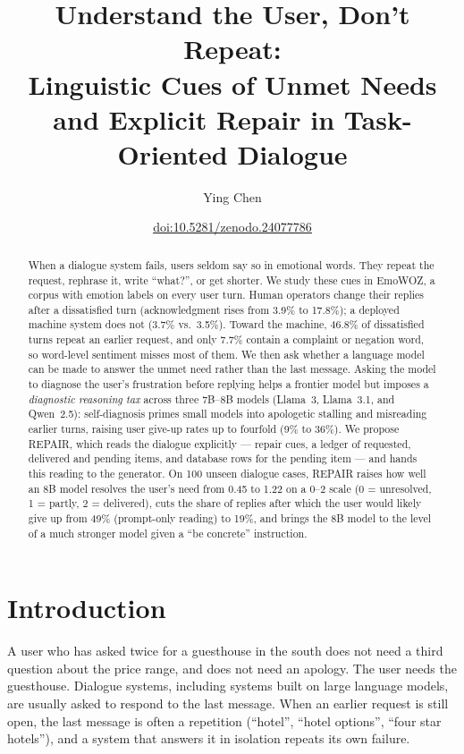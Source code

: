 \documentclass[11pt]{article}
\title{Understand the User, Don't Repeat:\\
Linguistic Cues of Unmet Needs and Explicit Repair in Task-Oriented Dialogue}
\author{Ying Chen}
\date{\href{https://doi.org/10.5281/zenodo.24077786}{doi:10.5281/zenodo.24077786}}
\begin{document}
\maketitle

\begin{abstract}
When a dialogue system fails, users seldom say so in emotional words. They repeat the request, rephrase it,
write ``what?'', or get shorter. We study these cues in EmoWOZ, a corpus with emotion labels on every user turn.
Human operators change their replies after a dissatisfied turn (acknowledgment rises from 3.9\% to 17.8\%);
a deployed machine system does not (3.7\% vs.\ 3.5\%). Toward the machine, 46.8\% of dissatisfied turns repeat
an earlier request, and only 7.7\% contain a complaint or negation word, so word-level sentiment misses most
of them. We then ask whether a language model can be made to answer the unmet need rather than the last
message. Asking the model to diagnose the user's frustration before replying helps a frontier model but
imposes a \emph{diagnostic reasoning tax} across three 7B--8B models (Llama~3, Llama~3.1, and Qwen~2.5):
self-diagnosis primes small models into apologetic stalling and misreading earlier turns, raising user give-up
rates up to fourfold (9\% to 36\%). We propose REPAIR, which reads the dialogue
explicitly --- repair cues, a ledger of requested, delivered and pending items, and database rows for the
pending item --- and hands this reading to the generator. On 100 unseen dialogue cases, REPAIR raises how
well an 8B model resolves the user's need from 0.45 to 1.22 on a 0--2 scale (0 = unresolved, 1 = partly,
2 = delivered), cuts the share of replies after which the user would likely give up from 49\% (prompt-only
reading) to 19\%, and brings the 8B model to the level of a much stronger model given a ``be concrete''
instruction.
\end{abstract}

\section{Introduction}
A user who has asked twice for a guesthouse in the south does not need a third question about the price
range, and does not need an apology. The user needs the guesthouse. Dialogue systems, including systems built
on large language models, are usually asked to respond to the last message. When an earlier request is still
open, the last message is often a repetition (``hotel'', ``hotel options'', ``four star hotels''), and a system
that answers it in isolation repeats its own failure.
\end{document}
